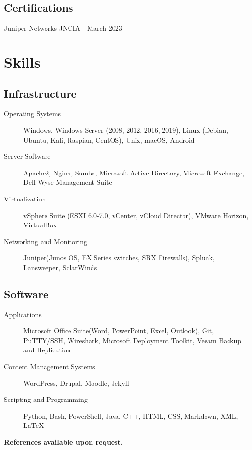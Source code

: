 \documentclass{article}
\begin{document}
\begin{samepage}
\begin{minipage}[t]{.35\textwidth}
	\subsection*{Certifications}
	Juniper Networks JNCIA - March 2023
\end{minipage}%

\section{Skills}

\subsection{Infrastructure}
\begin{description}
\item[Operating Systems] Windows, Windows Server (2008, 2012, 2016, 2019), Linux (Debian, Ubuntu, Kali, Raspian, CentOS), Unix,  macOS, Android
\item[Server Software] Apache2, Nginx, Samba, Microsoft Active Directory, Microsoft Exchange, Dell Wyse Management Suite
\item[Virtualization] vSphere Suite (ESXI 6.0-7.0, vCenter, vCloud Director), VMware Horizon, VirtualBox
\item[Networking and Monitoring] Juniper(Junos OS, EX Series switches, SRX Firewalls), Splunk, Lansweeper, SolarWinds
\end{description}

\subsection{Software}

\begin{description}
\item[Applications] Microsoft Office Suite(Word, PowerPoint, Excel, Outlook), Git, PuTTY/SSH, Wireshark, Microsoft Deployment Toolkit, Veeam Backup and Replication
\item[Content Management Systems] WordPress, Drupal, Moodle, Jekyll
\item[Scripting and Programming] Python, Bash, PowerShell, Java, C++, HTML, CSS, Markdown, XML, {\LaTeX}
\end{description}


\begin{center}
\textbf{References available upon request.}
\end{center}

\thispagestyle{empty}
\end{samepage}
\end{document}
